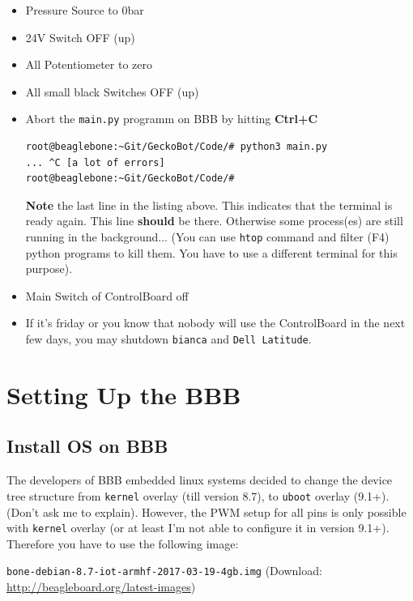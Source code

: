 \documentclass[
	fontsize=10pt
	paper=a4
]{scrartcl}
\begin{document}
\begin{itemize}
\item Pressure Source to 0bar
\item 24V Switch OFF (up)
\item All Potentiometer to zero
\item All small black Switches OFF (up)


\item Abort the \texttt{main.py} programm on BBB by hitting \textbf{Ctrl+C}
\begin{lstlisting}
root@beaglebone:~Git/GeckoBot/Code/# python3 main.py
... ^C [a lot of errors]
root@beaglebone:~Git/GeckoBot/Code/#
\end{lstlisting}

\textbf{Note} the last line in the listing above. This indicates that the terminal is ready again. This line \textbf{should} be there. Otherwise some process(es) are still running in the background... (You can use \texttt{htop} command and filter (F4) python programs to kill them. You have to use a different terminal for this purpose).

\item Main Switch of ControlBoard off

\item If it's friday or you know that nobody will use the ControlBoard in the next few days, you may shutdown \texttt{bianca} and \texttt{Dell Latitude}.

\end{itemize}




\clearpage
\section{Setting Up the BBB}




\subsection{Install OS on BBB}

The developers of BBB embedded linux systems decided to change the device tree structure from \texttt{kernel} overlay (till version 8.7), to \texttt{uboot} overlay (9.1+). (Don't ask me to explain).
However, the PWM setup for all pins is only possible with \texttt{kernel} overlay (or at least I'm not able to configure it in version 9.1+).
Therefore you have to use the following image:

\texttt{bone-debian-8.7-iot-armhf-2017-03-19-4gb.img}
(Download: \url{http://beagleboard.org/latest-images})
\end{document}
